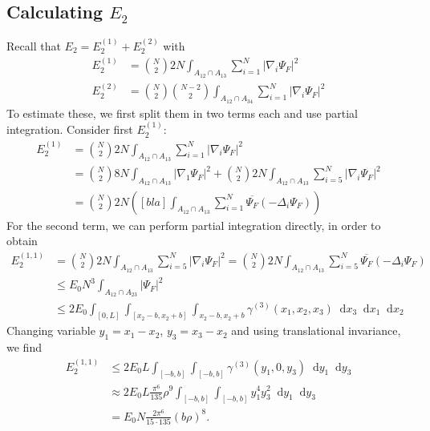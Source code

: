 \documentclass[a4paper,11pt]{article}
\newcommand{\abs}[1]{\left\lvert #1 \right\rvert}
\newcommand*\diff{\mathop{}\!\mathrm{d}}
\numberwithin{equation}{section}
\begin{document}
	\subsection{Calculating $ E_2 $}
	Recall that $ E_2=E_2^{(1)}+E_2^{(2)} $ with \begin{equation}
	\begin{aligned}
	E_2^{(1)}&=\binom{N}{2}2N\int_{A_{12}\cap A_{13}}\sum_{i=1}^{N}\abs{\nabla_i\Psi_F}^2\\ E_2^{(2)}&=\binom{N}{2}\binom{N-2}{2}\int_{A_{12}\cap A_{34}}\sum_{i=1}^{N}\abs{\nabla_i\Psi_F}^2
	\end{aligned}
	\end{equation}
	To estimate these, we first split them in two terms each and use partial integration. Consider first $ E_2^{(1)} $:
	\begin{equation}
	\begin{aligned}
	E_2^{(1)}&=\binom{N}{2}2N\int_{A_{12}\cap A_{13}}\sum_{i=1}^{N}\abs{\nabla_i\Psi_F}^2\\
	&=\binom{N}{2}8N\int_{A_{12}\cap A_{13}}\abs{\nabla_1\Psi_F}^2+\binom{N}{2}2N\int_{A_{12}\cap A_{13}}\sum_{i=5}^{N}\abs{\nabla_i\Psi_F}^2\\
	&=\binom{N}{2}2N\left(\left[bla\right]\int_{A_{12}\cap A_{13}}\sum_{i=1}^{N}\overline{\Psi_F}(-\Delta_i\Psi_F)\right)
	\end{aligned}
	\end{equation}
	For the second term, we can perform partial integration directly, in order to obtain \begin{equation}
	\begin{aligned}
		E_{2}^{(1,1)}&=\binom{N}{2}2N\int_{A_{12}\cap A_{13}}\sum_{i=5}^{N}\abs{\nabla_i\Psi_F}^2=\binom{N}{2}2N\int_{A_{12}\cap A_{13}}\sum_{i=5}^{N}\overline{\Psi_F}(-\Delta_i\Psi_F)\\
		&\leq E_0 N^3\int_{A_{12}\cap A_{23}}\abs{\Psi_F}^2\\&\leq 2E_0\int_{[0,L]}\int_{[x_2-b,x_2+b]}\int_{x_2-b,x_2+b}\gamma^{(3)}(x_1,x_2,x_3)\diff x_3\diff x_1\diff x_2
	\end{aligned}
	\end{equation}
	Changing variable $ y_1=x_1-x_2 $, $ y_3=x_3-x_2 $ and using translational invariance, we find \begin{equation}
	\begin{aligned}
	E_2^{(1,1)}&\leq 2E_0 L \int_{[-b,b]}\int_{[-b,b]}\gamma^{(3)}(y_1,0,y_3)\diff y_1\diff y_3
	\\&\approx 2E_0 L\frac{\pi^6}{135}\rho^9  \int_{[-b,b]}\int_{[-b,b]}y_1^4y_3^2\diff y_1\diff y_3\\
	&=E_0 N\frac{2\pi^6}{15\cdot 135}(b\rho)^8.
	\end{aligned}
	\end{equation}
	
\end{document}

